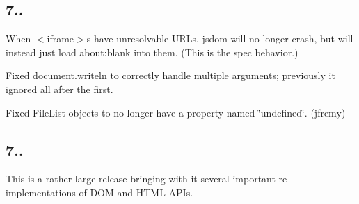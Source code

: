 \subsection*{7..}


\begin{DoxyItemize}
\item When {\ttfamily $<$iframe$>$}s have unresolvable U\+R\+Ls, jsdom will no longer crash, but will instead just load {\ttfamily about\+:blank} into them. (This is the spec behavior.)
\item Fixed {\ttfamily document.\+writeln} to correctly handle multiple arguments; previously it ignored all after the first.
\item Fixed {\ttfamily File\+List} objects to no longer have a property named {\ttfamily \char`\"{}undefined\char`\"{}}. (jfremy)
\end{DoxyItemize}

\subsection*{7..}

This is a rather large release bringing with it several important re-\/implementations of D\+OM and H\+T\+ML A\+P\+Is.


